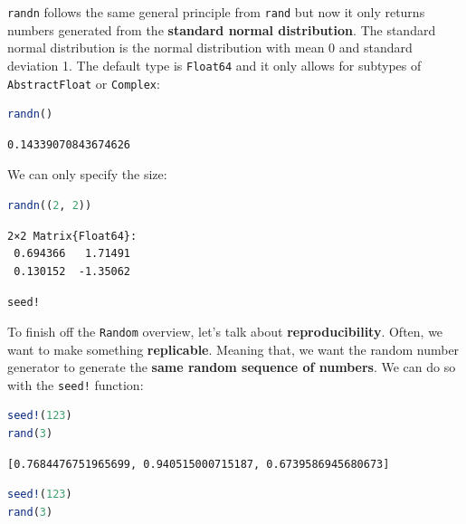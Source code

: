 \documentclass[
  notoc %
]{tufte-book}
\makeatletter
\newcommand{\passthrough}[1]{#1}
\renewcommand\subsubsection{%
\@startsection{subsubsection}{3}{\z@ }{-3.25ex\@plus -1ex \@minus -.2ex}{1.5ex \@plus .2ex}{\normalfont \normalsize \bfseries }
}
\makeatother
\begin{document}
\passthrough{\lstinline!randn!} follows the same general principle from
\passthrough{\lstinline!rand!} but now it only returns numbers generated
from the \textbf{standard normal distribution}. The standard normal
distribution is the normal distribution with mean 0 and standard
deviation 1. The default type is \passthrough{\lstinline!Float64!} and
it only allows for subtypes of \passthrough{\lstinline!AbstractFloat!}
or \passthrough{\lstinline!Complex!}:

\begin{lstlisting}[language=Julia]
randn()
\end{lstlisting}

\begin{lstlisting}[language=Output]
0.14339070843674626
\end{lstlisting}

We can only specify the size:

\begin{lstlisting}[language=Julia]
randn((2, 2))
\end{lstlisting}

\begin{lstlisting}[language=Output]
2×2 Matrix{Float64}:
 0.694366   1.71491
 0.130152  -1.35062
\end{lstlisting}

\hypertarget{sec:random_seed}{%
\subsubsection{\texorpdfstring{\texttt{seed!}}{seed!}}\label{sec:random_seed}}

To finish off the \passthrough{\lstinline!Random!} overview, let's talk
about \textbf{reproducibility}. Often, we want to make something
\textbf{replicable}. Meaning that, we want the random number generator
to generate the \textbf{same random sequence of numbers}. We can do so
with the \passthrough{\lstinline"seed!"} function:

\begin{lstlisting}[language=Julia]
seed!(123)
rand(3)
\end{lstlisting}

\begin{lstlisting}[language=Output]
[0.7684476751965699, 0.940515000715187, 0.6739586945680673]
\end{lstlisting}

\begin{lstlisting}[language=Julia]
seed!(123)
rand(3)
\end{lstlisting}
\end{document}
